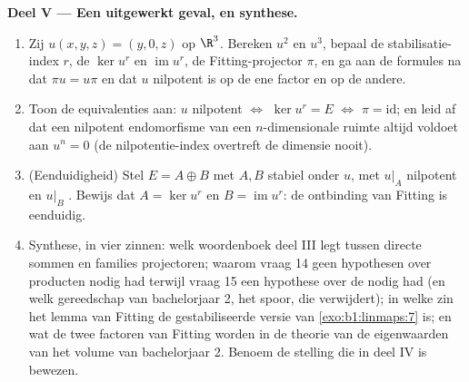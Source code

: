 \begin{problem}
\medskip
\noindent\textbf{Deel V --- Een uitgewerkt geval, en synthese.}
\begin{enumerate}[resume]
  \item Zij $u(x, y, z) = (y, 0, z)$ op $\R^3$. Bereken $u^2$ en
        $u^3$, bepaal de stabilisatie-index $r$, de 
        $\ker u^{r}$ en $\operatorname{im} u^{r}$, de
        Fitting-projector $\pi$, en ga aan de formules na dat $\pi
        u = u\pi$ en dat $u$ nilpotent is op de ene factor en
         op de andere.
  \item Toon de equivalenties aan: $u$ nilpotent $\iff$ $\ker
        u^{r} = E$ $\iff$ $\pi = \mathrm{id}$; en leid af dat een
        nilpotent endomorfisme van een $n$-dimensionale ruimte
        altijd voldoet aan $u^{n} = 0$ (de nilpotentie-index
        overtreft de dimensie nooit).
  \item (Eenduidigheid) Stel $E = A \oplus B$ met $A, B$ stabiel
        onder $u$, met $u|_A$ nilpotent en $u|_B$ . Bewijs
        dat $A = \ker u^{r}$ en $B = \operatorname{im} u^{r}$: de
        ontbinding van Fitting is eenduidig.
  \item Synthese, in vier zinnen: welk woordenboek deel III legt
        tussen directe sommen en families projectoren; waarom vraag
        14 geen hypothesen over producten nodig had terwijl vraag
        15 een hypothese over de  nodig had (en welk
        gereedschap van bachelorjaar 2, het spoor, die verwijdert);
        in welke zin het lemma van Fitting de gestabiliseerde
        versie van \cref{exo:b1:linmaps:7} is; en wat de twee
        factoren van Fitting worden in de theorie van de
        eigenwaarden van het volume van bachelorjaar 2. Benoem de
        stelling die in deel IV is bewezen.
\end{enumerate}
\end{problem}
